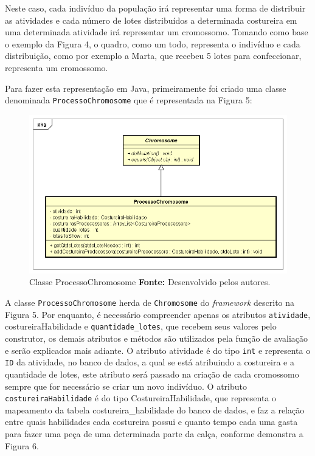 \par Neste caso, cada indivíduo da população irá representar uma forma de
distribuir as atividades e cada número de lotes distribuídos a determinada
costureira em uma determinada atividade irá representar um cromossomo. 
Tomando como base o exemplo da Figura 4, o quadro, como um todo, representa 
o indivíduo e cada distribuição, como por exemplo a Marta, que recebeu 5 
lotes para confeccionar, representa um cromossomo.

\par Para fazer esta representação em Java, primeiramente foi criado uma classe denominada \texttt{ProcessoChromosome} que é
representada na Figura 5:

\begin{figure}[h!]
	\centerline{\includegraphics[scale=0.6]{./imagens/processo_chromosome_diagram.png}}
	\caption[ProcessoChromosome Class]
	{Classe ProcessoChromosome \textbf{Fonte:} Desenvolvido pelos autores.}
	\label{fig:exemplo1}
\end{figure}


\par A classe \texttt{ProcessoChromosome} herda de \texttt{Chromosome} do
\textit{framework} descrito na Figura 5. Por enquanto, é necessário compreender
apenas os atributos \texttt{atividade}, costureiraHabilidade e
\texttt{quantidade\_lotes}, que recebem seus valores pelo construtor, os
demais atributos e métodos são utilizados pela função de avaliação e serão explicados mais adiante. 
O atributo atividade é do tipo \texttt{int} e representa o \texttt{ID} da
atividade, no banco de dados, a qual se está atribuindo a costureira e a
quantidade de lotes, este atributo será passado na criação de cada cromossomo
sempre que for necessário se criar um novo indivíduo. O atributo \texttt{costureiraHabilidade} é do tipo CostureiraHabilidade, que representa o
mapeamento da tabela costureira\_habilidade do banco de dados, e faz a relação
entre quais habilidades cada costureira possui e quanto tempo cada uma gasta para fazer uma peça de 
uma determinada parte da calça, conforme demonstra a Figura 6.

